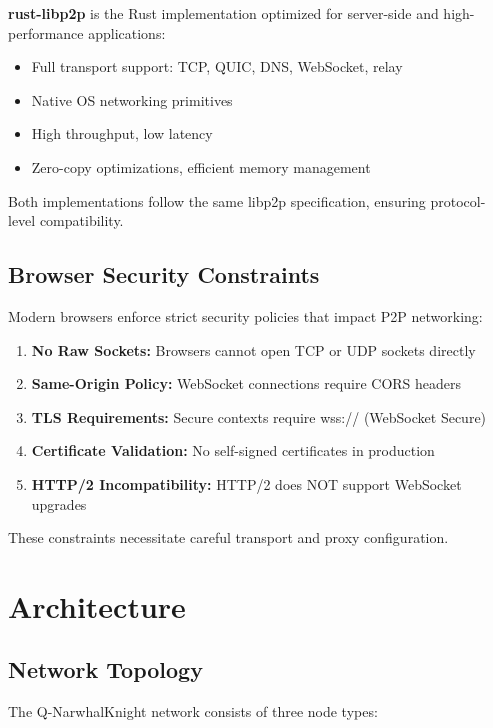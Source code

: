 \documentclass[11pt,a4paper]{article}
\begin{document}
\textbf{rust-libp2p} is the Rust implementation optimized for server-side and high-performance applications:

\begin{itemize}
    \item Full transport support: TCP, QUIC, DNS, WebSocket, relay
    \item Native OS networking primitives
    \item High throughput, low latency
    \item Zero-copy optimizations, efficient memory management
\end{itemize}

Both implementations follow the same libp2p specification, ensuring protocol-level compatibility.

\subsection{Browser Security Constraints}

Modern browsers enforce strict security policies that impact P2P networking:

\begin{enumerate}
    \item \textbf{No Raw Sockets:} Browsers cannot open TCP or UDP sockets directly
    \item \textbf{Same-Origin Policy:} WebSocket connections require CORS headers
    \item \textbf{TLS Requirements:} Secure contexts require wss:// (WebSocket Secure)
    \item \textbf{Certificate Validation:} No self-signed certificates in production
    \item \textbf{HTTP/2 Incompatibility:} HTTP/2 does NOT support WebSocket upgrades
\end{enumerate}

These constraints necessitate careful transport and proxy configuration.

\section{Architecture}

\subsection{Network Topology}

The Q-NarwhalKnight network consists of three node types:
\end{document}
